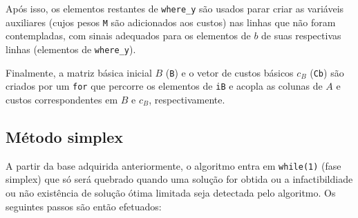 \documentclass[]{article}
\begin{document}
 Após isso, os elementos restantes de \verb+where_y+ são usados parar criar as variáveis auxiliares (cujos pesos \verb+M+ são adicionados aos custos) nas linhas que não foram contempladas, com sinais adequados para os elementos de $b$ de suas respectivas linhas (elementos de \verb+where_y+).
 
 Finalmente, a matriz básica inicial $B$ (\verb+B+) e o vetor de custos básicos $c_B$ (\verb+Cb+) são criados por um \verb+for+ que percorre os elementos de \verb+iB+ e acopla as colunas de $A$ e custos correspondentes em $B$ e $c_B$, respectivamente.
\subsection{Método simplex}
A partir da base adquirida anteriormente, o algoritmo entra em \verb+while(1)+ (fase simplex) que só será quebrado quando uma solução for obtida ou a infactibildiade ou não existência de solução ótima limitada seja detectada pelo algoritmo. Os seguintes passos são então efetuados:
\end{document}
